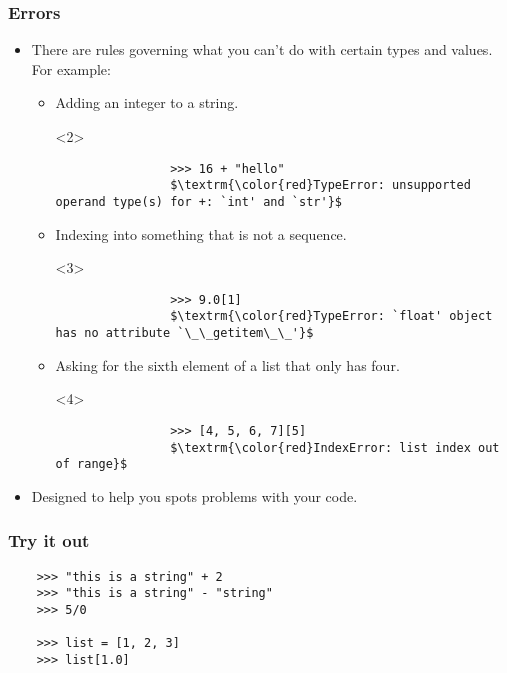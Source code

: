 \documentclass[notes]{beamer}
\begin{document}
\begin{frame}[fragile]
    \frametitle{Errors}
    
    \begin{itemize}
        \item There are rules governing what you can't do with certain types and values.
        \pause For example:
        \begin{itemize}
            \item Adding an integer to a string.
            \begin{onlyenv}<2>
                \begin{lstlisting}
                >>> 16 + "hello"
                $\textrm{\color{red}TypeError: unsupported operand type(s) for +: `int' and `str'}$
                \end{lstlisting}
            \end{onlyenv}
            
            \pause
            
            \item Indexing into something that is not a sequence.
            \begin{onlyenv}<3>
                \begin{lstlisting}
                >>> 9.0[1]
                $\textrm{\color{red}TypeError: `float' object has no attribute `\_\_getitem\_\_'}$
                \end{lstlisting}
            \end{onlyenv}
            
            \pause
            
            \item Asking for the sixth element of a list that only has four.
            \begin{onlyenv}<4>
                \begin{lstlisting}
                >>> [4, 5, 6, 7][5]
                $\textrm{\color{red}IndexError: list index out of range}$
                \end{lstlisting}
            \end{onlyenv}
            
            \pause
        \end{itemize}
        \item Designed to help you spots problems with your code.
    \end{itemize}
\end{frame}

\begin{frame}[fragile]
    \frametitle{Try it out}

    \begin{lstlisting}
    >>> "this is a string" + 2
    >>> "this is a string" - "string"
    >>> 5/0
    
    >>> list = [1, 2, 3]
    >>> list[1.0]
    \end{lstlisting}
\end{frame}
\end{document}
